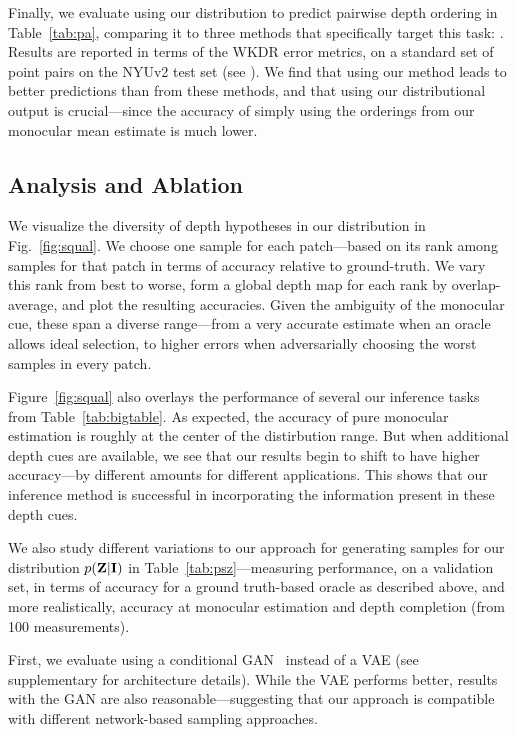 \documentclass[10pt,twocolumn,letterpaper]{article}
\begin{document}
Finally, we evaluate using our distribution to predict pairwise depth ordering in Table~\ref{tab:pa}, comparing it to three methods that specifically target this task: \cite{chen2016single,zoran2015learning,xian2018monocular}. Results are reported in terms of the WKDR error metrics, on a standard set of point pairs on the NYUv2 test set (see \cite{zoran2015learning}). We find that using our method leads to better predictions than from these methods, and that using our distributional output is crucial---since the accuracy of simply using the orderings from our monocular mean estimate is much lower.

\subsection{Analysis and Ablation}

We visualize the diversity of depth hypotheses in our distribution in Fig.~\ref{fig:squal}. We choose one sample for each patch---based on its rank among samples for that patch in terms of accuracy relative to ground-truth. We vary this rank from best to worse, form a global depth map for each rank by overlap-average, and plot the resulting accuracies. Given the ambiguity of the monocular cue, these span a diverse range---from a very accurate estimate when an oracle allows ideal selection, to higher errors when adversarially choosing the worst samples in every patch.

Figure~\ref{fig:squal} also overlays the performance of several our inference tasks from Table~\ref{tab:bigtable}. As expected, the accuracy of pure monocular estimation is roughly at the center of the distirbution range. But when additional depth cues are available, we see that our results begin to shift to have higher accuracy---by different amounts for different applications. This shows that our inference method is successful in incorporating the information present in these depth cues.

We also study different variations to our approach for generating samples for our distribution $p(\mathbf{Z}|\mathbf{I})$ in Table~\ref{tab:psz}---measuring  performance, on a validation set, in terms of accuracy for a ground truth-based oracle as described above, and more realistically, accuracy at monocular estimation and depth completion (from 100 measurements).

First, we evaluate using a conditional GAN~\cite{mirza2014conditional} instead of a VAE (see supplementary for architecture details). While the VAE performs better, results with the GAN are also reasonable---suggesting that our approach is compatible with different network-based sampling approaches.
\end{document}
